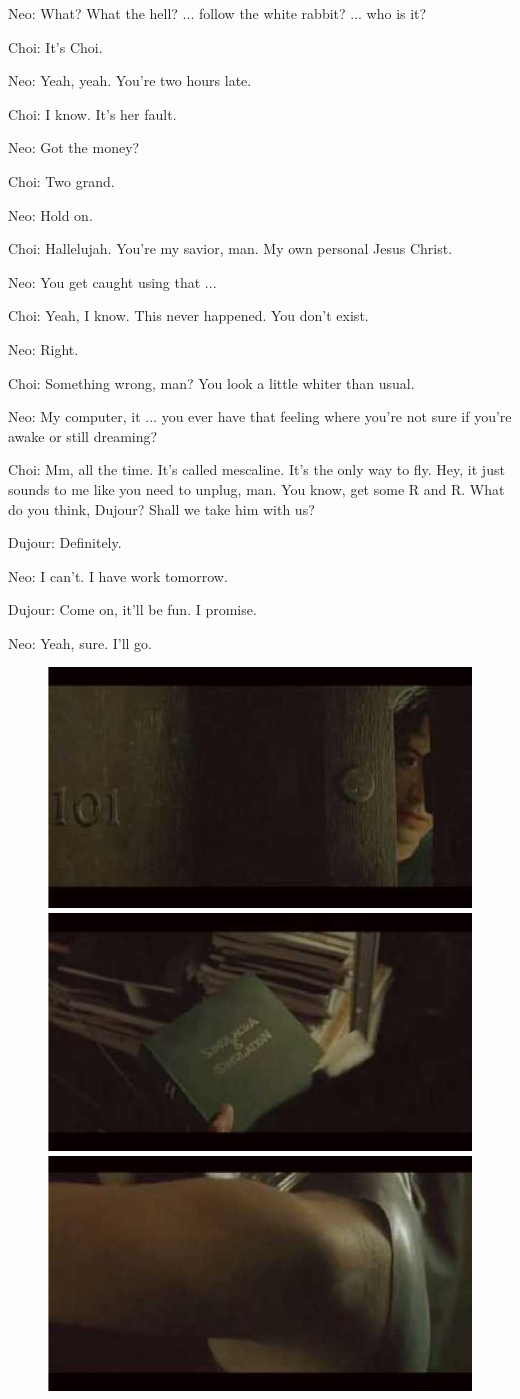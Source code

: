 \documentclass{ctexart}
\newenvironment{myquote}{\color{green} \setlength{\leftskip}{6em} \setlength{\rightskip}{4em} \setlength{\parindent}{-2em}}{\par}
\begin{document}
\begin{myquote}
Neo: What? What the hell? ... follow the white rabbit? ... who is it?

Choi: It's Choi.

Neo: Yeah, yeah. You're two hours late.

Choi: I know. It's her fault.

Neo: Got the money?

Choi: Two grand.

Neo: Hold on.

Choi: Hallelujah. You're my savior, man. My own personal Jesus Christ.

Neo: You get caught using that ...

Choi: Yeah, I know. This never happened. You don't exist.

Neo: Right.

Choi: Something wrong, man? You look a little whiter than usual.

Neo: My computer, it ... you ever have that feeling where you're not sure if you're awake or still dreaming?

Choi: Mm, all the time. It's called mescaline. It's the only way to fly. Hey, it just sounds to me like you need to unplug, man. You know, get some R and R. What do you think, Dujour? Shall we take him with us?

Dujour: Definitely.

Neo: I can't. I have work tomorrow.

Dujour: Come on, it'll be fun. I promise.

Neo: Yeah, sure. I'll go.
\end{myquote}

\begin{figure}[htb]
\centering
\includegraphics[width=0.5\linewidth]{fig/read_Matrix-4}
\includegraphics[width=0.5\linewidth]{fig/read_Matrix-4-1}
\includegraphics[width=0.5\linewidth]{fig/read_Matrix-4-2}
\end{figure}
\end{document}
